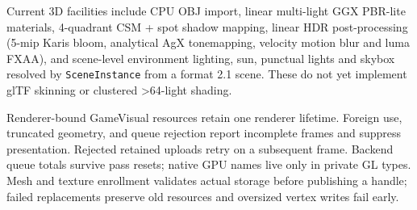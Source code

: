 Current 3D facilities include CPU OBJ import, linear multi-light GGX PBR-lite
materials, 4-quadrant CSM + spot shadow mapping, linear HDR post-processing
(5-mip Karis bloom, analytical AgX tonemapping, velocity motion blur and luma
FXAA), and scene-level environment lighting, sun, punctual lights and skybox
resolved by \texttt{SceneInstance} from a format 2.1 scene. These do not yet
implement glTF skinning or clustered >64-light shading.

Renderer-bound GameVisual resources retain one renderer lifetime. Foreign use,
truncated geometry, and queue rejection report incomplete frames and suppress
presentation. Rejected retained uploads retry on a subsequent frame. Backend
queue totals survive pass resets; native GPU names live only in private GL types.
Mesh and texture enrollment validates actual storage before publishing a handle;
failed replacements preserve old resources and oversized vertex writes fail early.
